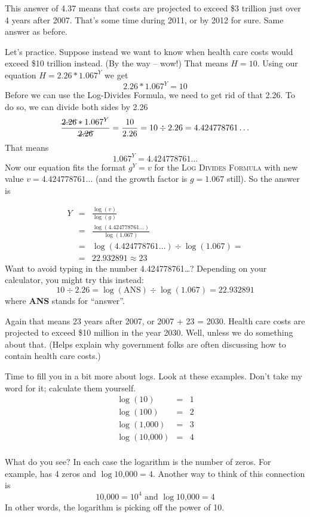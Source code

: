 This answer of 4.37 means that costs are projected to exceed \$3 trillion just over 4 years after 2007.  That's some time during 2011, or by 2012 for sure.  Same answer as before. 

Let's practice. Suppose instead we want to know when health care costs would exceed \$10 trillion instead.  (By the way -- wow!)  That means $H = 10$.  Using our equation $H=2.26\ast1.067^Y$ we get $$2.26\ast1.067^Y=10$$
Before we can use the Log-Divides Formula, we need to get rid of that 2.26.  To do so, we can divide both sides by 2.26
$$\frac{\cancel{2.26}\ast1.067^Y}{\cancel{2.26}}=\frac{10}{2.26}=10 \div 2.26 = 4.424778761\ldots$$ 
That means
$$1.067^Y=4.424778761\ldots$$
Now our equation fits the format $g^Y=v$ for the \textsc{Log Divides Formula} with new value $v=4.424778761\ldots$ (and the growth factor is $g=1.067$ still).  So the answer is 

\begin{eqnarray*}
Y & = &  \frac{\log (v)}{\log(g)}\\
& = &  \frac{\log (4.424778761\ldots)}{\log(1.067)}\\
& =  &  \log (4.424778761\ldots) \div \log (1.067) = \\
& =  &  22.932891 \approx 23 
\end{eqnarray*}
Want to avoid typing in the number 4.424778761\ldots? Depending on your calculator, you might try this instead:
$$10 \div 2.26 = \log(\text{ANS}) \div \log(1.067)= 22.932891$$
where \textbf{ANS} stands for ``answer''.  %

Again that means 23 years after 2007, or 2007 + 23 = 2030.  Health care costs are projected to exceed \$10 million in the year 2030.  Well, unless we do something about that.  (Helps explain why government folks are often discussing how to contain health care costs.)

Time to fill you in a bit more about logs.  Look at these examples.  Don't take my word for it; calculate them yourself.
\begin{eqnarray*}
\log (10) & = & 1 \\
\log (100) & = & 2 \\
\log (\text{1,000}) & = & 3 \\
\log (\text{10,000}) & = & 4 \\
\end{eqnarray*}
\vspace{-.5in} %

\noindent What do you see?  In each case the logarithm is the number of zeros.  For example,  has 4 zeros and $\log \text{10,000}=4$.  Another way to think of this connection is $$ \text{10,000} = 10^4 \text{ and } \log \text{10,000}=4$$ In other words, the logarithm is picking off the power of 10.  

